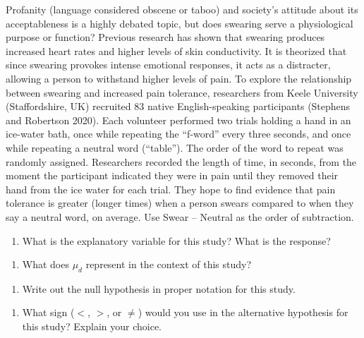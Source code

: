 \documentclass[
]{report}
\providecommand{\tightlist}{%
  \setlength{\itemsep}{0pt}\setlength{\parskip}{0pt}}
\begin{document}
Profanity (language considered obscene or taboo) and society's attitude about its acceptableness is a highly debated topic, but does swearing serve a physiological purpose or function? Previous research has shown that swearing produces increased heart rates and higher levels of skin conductivity. It is theorized that since swearing provokes intense emotional responses, it acts as a distracter, allowing a person to withstand higher levels of pain. To explore the relationship between swearing and increased pain tolerance, researchers from Keele University (Staffordshire, UK) recruited 83 native English-speaking participants (Stephens and Robertson 2020). Each volunteer performed two trials holding a hand in an ice-water bath, once while repeating the ``f-word'' every three seconds, and once while repeating a neutral word (``table''). The order of the word to repeat was randomly assigned. Researchers recorded the length of time, in seconds, from the moment the participant indicated they were in pain until they removed their hand from the ice water for each trial. They hope to find evidence that pain tolerance is greater (longer times) when a person swears compared to when they say a neutral word, on average. Use Swear -- Neutral as the order of subtraction.

\begin{enumerate}
\def\labelenumi{\arabic{enumi}.}
\tightlist
\item
  What is the explanatory variable for this study? What is the response?
\end{enumerate}

\vspace{0.5in}

\begin{enumerate}
\def\labelenumi{\arabic{enumi}.}
\setcounter{enumi}{1}
\tightlist
\item
  What does \(\mu_d\) represent in the context of this study?
\end{enumerate}

\vspace{0.8in}

\begin{enumerate}
\def\labelenumi{\arabic{enumi}.}
\setcounter{enumi}{2}
\tightlist
\item
  Write out the null hypothesis in proper notation for this study.
\end{enumerate}

\vspace{0.4in}

\begin{enumerate}
\def\labelenumi{\arabic{enumi}.}
\setcounter{enumi}{3}
\tightlist
\item
  What sign (\(<\), \(>\), or \(\neq\)) would you use in the alternative hypothesis for this study? Explain your choice.
\end{enumerate}
\end{document}
